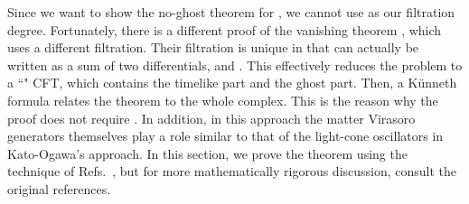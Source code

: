 \documentclass[a4paper,12pt]{article}
\begin{document}
Since we want to show the no-ghost theorem for \coordHE{}, we cannot use \coordHE{} as our filtration degree. Fortunately, there is a different
proof of the vanishing theorem \cite{FGZ,LZ,FK}, which uses a different
filtration.
Their filtration is unique in that \coordHE{} can actually be written as a sum of
two differentials, \coordHE{} and \coordHE{}. This effectively reduces the problem to a
``\coordHE{}" CFT, which contains the timelike part and the \coordHE{} ghost part. Then,
a K\"{u}nneth formula relates the theorem to the whole complex.
This is the reason why the proof does not require \coordHE{}.
In addition, in this approach the
matter Virasoro generators themselves play a role similar to that of the
light-cone oscillators in Kato-Ogawa's approach. In this section, we 
prove the theorem using the technique of
Refs.~\cite{FGZ,LZ,FK}, but for more
mathematically rigorous discussion,
consult the original references.
\end{document}
